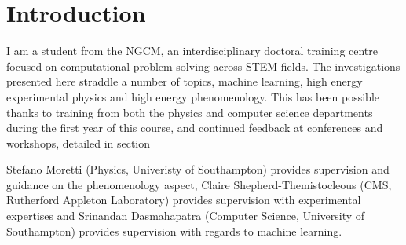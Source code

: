 \section{Introduction}

I am a student from the NGCM,
an interdisciplinary doctoral training centre focused on 
computational problem solving across STEM fields.
The investigations presented here straddle a number of topics, machine learning, high energy experimental physics and high energy phenomenology. 
This has been possible thanks to training
from both the physics and computer science departments
during the first year of this course,
and continued feedback at conferences and workshops, detailed in section %

Stefano Moretti (Physics, Univeristy of Southampton) provides supervision and guidance on the phenomenology aspect,
Claire Shepherd-Themistocleous (CMS, Rutherford Appleton Laboratory) provides supervision with experimental expertises and
Srinandan Dasmahapatra (Computer Science, University of Southampton) provides supervision with regards to machine learning.



